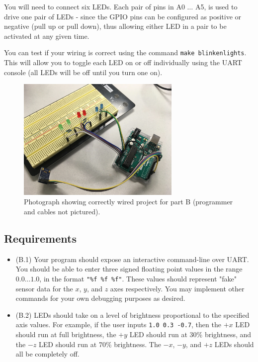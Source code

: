 \documentclass{article}
\begin{document}
You will need to connect six LEDs. Each pair of pins in A0 $\dots$ A5, is used
to drive one pair of LEDs - since the GPIO pins can be configured as positive
or negative (pull up or pull down), thus allowing either LED in a pair to be
activated at any given time.

You can test if your wiring is correct using the command \texttt{make
blinkenlights}. This will allow you to toggle each LED on or off individually
using the UART console (all LEDs will be off until you turn one on).

\begin{figure}[H]
	\centering

	\includegraphics[max width = 0.7\textwidth]{wiring_part_b.jpg}

	\caption{Photograph showing correctly wired project for part B
	(programmer and cables not pictured).}

\end{figure}

\subsection{Requirements}

\begin{itemize}

	\item (B.1) Your program should expose an interactive command-line over
		UART. You should be able to enter three signed floating point
		values in the range $0.0\dots1.0$, in the format \texttt{"\%f
		\%f \%f"}. These values should represent "fake" sensor data for
		the $x$, $y$, and $z$ axes respectively. You may implement
		other commands for your own debugging purposes as desired.

	\item (B.2) LEDs should take on a level of brightness proportional to
		the specified axis values. For example, if the user inputs
		\texttt{1.0 0.3 -0.7}, then the $+x$ LED should run at full
		brightness, the $+y$ LED should run at 30\% brightness, and
		the $-z$ LED should run at 70\% brightness. The $-x$, $-y$, and
		$+z$ LEDs should all be completely off.


\end{itemize}
\end{document}
